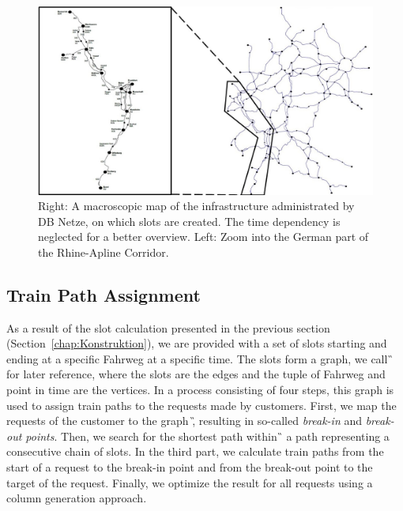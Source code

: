 %
\begin{figure}[tb]
	\centering
	\includegraphics[scale=0.37]{Bilder/D-Karte+Zoom.jpg}
	\caption{Right: A macroscopic map of the infrastructure administrated by DB Netze, on which slots are created. The time dependency is neglected for a better overview. Left: Zoom into the German part of the Rhine-Apline Corridor.}
	\label{fig:STAKarte}
\end{figure}


\subsection{Train Path Assignment}
\label{chap:Belegung}
%
As a result of the slot calculation presented in the previous section (Section~\ref{chap:Konstruktion}), we are provided with a set of slots starting and ending at a specific Fahrweg at a specific time. The slots form a graph, we call \G\, for later reference, where the slots are the edges and the tuple of Fahrweg and point in time are the vertices. In a process consisting of four steps, this graph is used to assign train paths to the requests made by customers. First, we map the requests of the customer to the graph \G, resulting in so-called \emph{break-in} and \emph{break-out points}. Then, we search for the shortest path within \G\, a path representing a consecutive chain of slots. In the third part, we calculate train paths from the start of a request to the break-in point and from the break-out point to the target of the request. Finally, we optimize the result for all requests using a column generation approach.

